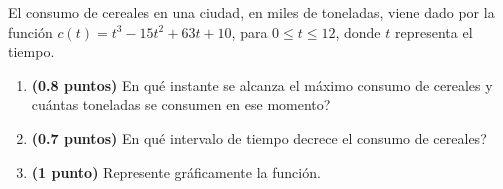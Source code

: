 
El consumo de cereales en una ciudad, en miles de toneladas, viene dado por la función $c(t)=t^3-15t^2+63t+10$, para $0\leq t\leq12$, donde $t$ representa el tiempo.
\begin{enumerate}[label=\alph*)]
\item \textbf{(0.8 puntos)} \textquestiondown{}En qué instante se alcanza el máximo consumo de cereales y cuántas toneladas se consumen en ese momento?
\item \textbf{(0.7 puntos)} \textquestiondown{}En qué intervalo de tiempo decrece el consumo de cereales?
\item \textbf{(1 punto)} Represente gráficamente la función.
\end{enumerate}
